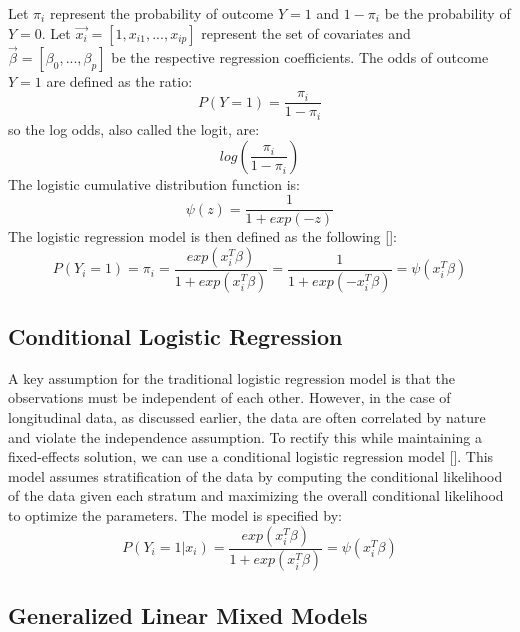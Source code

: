 \documentclass{article}
\begin{document}
    Let $\pi_i$ represent the probability of outcome $Y=1$ and $1-\pi_i$ be the probability of $Y=0$. Let $\vec{x_i} = [1, x_{i1},...,x_{ip}]$ represent the set of covariates and $\vec{\beta} = [\beta_0,...,\beta_p]$ be the respective regression coefficients. The odds of outcome $Y = 1$ are defined as the ratio: \begin{equation}P(Y=1)=\frac{\pi_i}{1-\pi_i}\end{equation}
    so the log odds, also called the logit, are:
    \begin{equation} log\left(\frac{\pi_i}{1-\pi_i}\right) \end{equation} 
    The logistic cumulative distribution function is: \begin{equation}
        \psi(z) = \frac{1}{1+exp(-z)}
    \end{equation} 
    The logistic regression model is then defined as the following [\citealt{gibbons2006longitudinal}]: 
    \begin{equation}
    P(Y_i = 1) = \pi_i = \frac{exp(x_i^T\beta)}{1+exp(x_i^T\beta)} = \frac{1}{1+exp(-x_i^T\beta)} = \psi(x_i^T\beta)
    \end{equation} 

    \subsection{Conditional Logistic Regression}
    A key assumption for the traditional logistic regression model is that the observations must be independent of each other. However, in the case of longitudinal data, as discussed earlier, the data are often correlated by nature and violate the independence assumption. To rectify this while maintaining a fixed-effects solution, we can use a conditional logistic regression model [\citealt{agresti2015foundations}]. This model assumes stratification of the data by computing the conditional likelihood of the data given each stratum and maximizing the overall conditional likelihood to optimize the parameters. The model is specified by: 
    \begin{equation}
    P(Y_i = 1 | x_i) = \frac{exp(x_i^T\beta)}{1+exp(x_i^T\beta)} = \psi(x_i^T\beta)
    \end{equation} 
    
    \subsection{Generalized Linear Mixed Models} 
\end{document}
